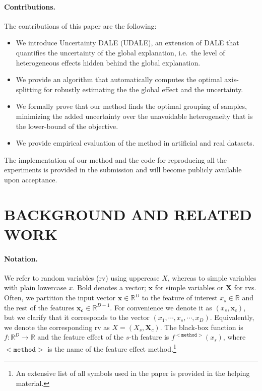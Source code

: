 \documentclass[twoside]{article}
\newcommand{\xc}{\mathbf{x_c}}
\newcommand{\xb}{\mathbf{x}}
\begin{document}
\paragraph{Contributions.} The contributions of this paper are the following:

\begin{itemize}
\item We introduce Uncertainty DALE (UDALE), an extension of DALE that
  quantifies the uncertainty of the global explanation, i.e.~the level
  of heterogeneous effects hidden behind the global explanation.
\item We provide an algorithm that automatically computes the optimal
  axis-splitting for robustly estimating the the global effect and the
  uncertainty.
\item We formally prove that our method finds the optimal grouping of
  samples, minimizing the added uncertainty over the unavoidable
  heterogeneity that is the lower-bound of the objective.
\item We provide empirical evaluation of the method in artificial and
  real datasets.
\end{itemize}

The implementation of our method and the code for reproducing all the
experiments is provided in the submission and will become publicly
available upon acceptance.


\section{BACKGROUND AND RELATED WORK}

\paragraph{Notation.} We refer to random variables (rv) using
uppercase \( X \), whereas to simple variables with plain lowercase
\( x \). Bold denotes a vector; \( \xb \) for simple variables or
\(\mathbf{X}\) for rvs. Often, we partition the input vector
\(\xb \in \mathbb{R}^D\) to the feature of interest
\(x_s \in \mathbb{R} \) and the rest of the features
\(\xc \in \mathbb{R}^{D-1}\). For convenience we denote it as
\((x_s, \mathbf{x}_c)\), but we clarify that it corresponds to the
vector \((x_1, \cdots , x_s, \cdots, x_D)\). Equivalently, we denote
the corresponding rv as \(X = (X_s, \mathbf{X}_c)\). The black-box
function is \(f : \mathbb{R}^D \rightarrow \mathbb{R}\) and the
feature effect of the \(s\)-th feature is
\(f^{\mathtt{<method>}}(x_s)\), where \(\mathtt{<method>}\) is the
name of the feature effect method.\footnote{An extensive list of all
  symbols used in the paper is provided in the helping material.}
\end{document}
